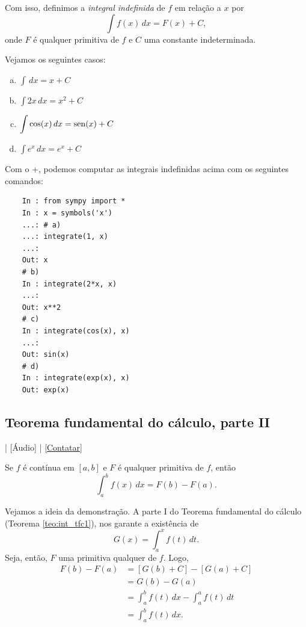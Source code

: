 Com isso, definimos a \emph{integral indefinida} de $f$ em relação a $x$ por
\begin{equation}
  \int f(x)\,dx = F(x) + C,
\end{equation}
onde $F$ é qualquer primitiva de $f$ e $C$ uma constante indeterminada.

\begin{ex}
  Vejamos os seguintes casos:
  \begin{enumerate}[a)]
  \item $\displaystyle \int \,dx = x + C$
  \item $\displaystyle \int 2x\,dx = x^2 + C$
  \item $\displaystyle \int \cos(x)\,dx = \operatorname{sen}(x) + C$
  \item $\displaystyle \int e^x\,dx = e^x + C$
  \end{enumerate}
  \ifispython
  Com o {\python}+{\sympy}, podemos computar as integrais indefinidas acima com os seguintes comandos:
  \begin{lstlisting}
    In : from sympy import *
    In : x = symbols('x')
    ...: # a)
    ...: integrate(1, x)
    ...: 
    Out: x
    # b)
    In : integrate(2*x, x)
    ...: 
    Out: x**2
    # c)
    In : integrate(cos(x), x)
    ...: 
    Out: sin(x)
    # d)
    In : integrate(exp(x), x)
    Out: exp(x)
  \end{lstlisting}
  \fi  
\end{ex}

\subsection{Teorema fundamental do cálculo, parte II}

\begin{flushright}
  [Vídeo] | [Áudio] | \href{https://phkonzen.github.io/notas/contato.html}{[Contatar]}
\end{flushright}

\begin{teo}\label{teo:int_tfc2}
  Se $f$ é contínua em $[a, b]$ e $F$ é qualquer primitiva de $f$, então
  \begin{equation}
    \int_a^b f(x)\,dx = F(b) - F(a).
  \end{equation}
\end{teo}
\begin{dem}
  Vejamos a ideia da demonstração. A parte I do Teorema fundamental do cálculo (Teorema \ref{teo:int_tfc1}), nos garante a existência de
  \begin{equation}
    G(x) = \int_a^x f(t)\,dt.
  \end{equation}
  Seja, então, $F$ uma primitiva qualquer de $f$. Logo,
  \begin{align}
    F(b) - F(a) &= [G(b) + C] - [G(a) + C] \\
                &= G(b) - G(a) \\
                &= \int_a^b f(t)\,dx - \int_a^a f(t)\,dt \\
                &= \int_a^b f(t)\,dx.
  \end{align}
\end{dem}

